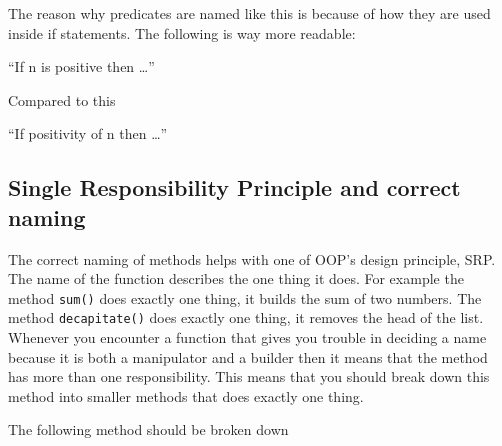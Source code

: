 The reason why predicates are named like this is because of how they are
used inside if statements. The following is way more readable:

\begin{Shaded}
\begin{Highlighting}[]
\NormalTok{:}
     \OperatorTok{{-}}
\end{Highlighting}
\end{Shaded}

``If n is positive then \ldots{}''

Compared to this

\begin{Shaded}
\begin{Highlighting}[]
\NormalTok{:}
     \OperatorTok{{-}}
\end{Highlighting}
\end{Shaded}

``If positivity of n then \ldots{}''

\subsection{Single Responsibility Principle and correct
naming}\label{extra-stuff.md__single-responsibility-principle-and-correct-naming}

The correct naming of methods helps with one of OOP's design principle,
SRP. The name of the function describes the one thing it does. For
example the method \texttt{sum()} does exactly one thing, it builds the
sum of two numbers. The method \texttt{decapitate()} does exactly one
thing, it removes the head of the list. Whenever you encounter a
function that gives you trouble in deciding a name because it is both a
manipulator and a builder then it means that the method has more than
one responsibility. This means that you should break down this method
into smaller methods that does exactly one thing.

The following method should be broken down

\begin{Shaded}
\begin{Highlighting}[]
\NormalTok{):}
\OperatorTok{=} \NormalTok{.\_\_list[}\NormalTok{]}
    \OperatorTok{=} \NormalTok{.\_\_list[}\NormalTok{::]}
\end{Highlighting}
\end{Shaded}

